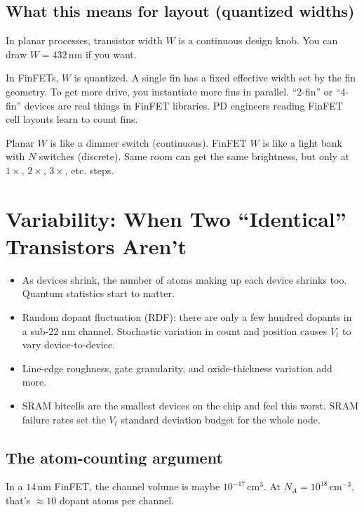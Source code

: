 \documentclass[11pt]{article}
\begin{document}
\subsection{What this means for layout (quantized widths)}

In planar processes, transistor width $W$ is a continuous design knob. You can draw $W = 432\,\text{nm}$ if you want.

In FinFETs, $W$ is quantized. A single fin has a fixed effective width set by the fin geometry. To get more drive, you instantiate more fins in parallel. ``2-fin'' or ``4-fin'' devices are real things in FinFET libraries. PD engineers reading FinFET cell layouts learn to count fins.

\begin{hook}
Planar $W$ is like a dimmer switch (continuous). FinFET $W$ is like a light bank with $N$ switches (discrete). Same room can get the same brightness, but only at $1\times$, $2\times$, $3\times$, etc. steps.
\end{hook}

\section{Variability: When Two ``Identical'' Transistors Aren't}

\begin{tldr}
\begin{itemize}[leftmargin=*]
\item As devices shrink, the number of atoms making up each device shrinks too. Quantum statistics start to matter.
\item Random dopant fluctuation (RDF): there are only a few hundred dopants in a sub-22 nm channel. Stochastic variation in count and position causes $V_t$ to vary device-to-device.
\item Line-edge roughness, gate granularity, and oxide-thickness variation add more.
\item SRAM bitcells are the smallest devices on the chip and feel this worst. SRAM failure rates set the $V_t$ standard deviation budget for the whole node.
\end{itemize}
\end{tldr}

\subsection{The atom-counting argument}

In a $14\,\text{nm}$ FinFET, the channel volume is maybe $10^{-17}\,\text{cm}^3$. At $N_A = 10^{18}\,\text{cm}^{-3}$, that's $\approx 10$ dopant atoms per channel.
\end{document}
